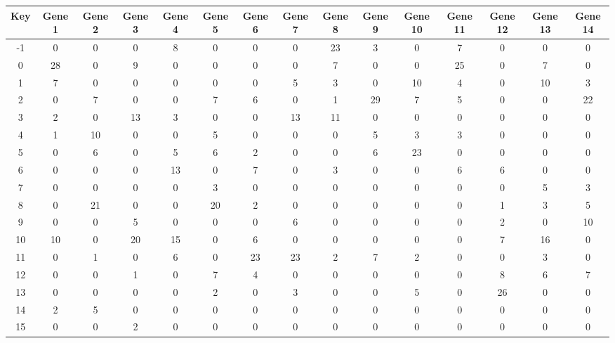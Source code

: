 \begin{tabular}{|c|c|c|c|c|c|c|c|c|c|c|c|c|c|c|}
\hline
Key & Gene 1 & Gene 2 & Gene 3 & Gene 4 & Gene 5 & Gene 6 & Gene 7 & Gene 8 & Gene 9 & Gene 10 & Gene 11 & Gene 12 & Gene 13 & Gene 14 \\
\hline
-1 & 0 & 0 & 0 & 8 & 0 & 0 & 0 & 23 & 3 & 0 & 7 & 0 & 0 & 0 \\
0 & 28 & 0 & 9 & 0 & 0 & 0 & 0 & 7 & 0 & 0 & 25 & 0 & 7 & 0 \\
1 & 7 & 0 & 0 & 0 & 0 & 0 & 5 & 3 & 0 & 10 & 4 & 0 & 10 & 3 \\
2 & 0 & 7 & 0 & 0 & 7 & 6 & 0 & 1 & 29 & 7 & 5 & 0 & 0 & 22 \\
3 & 2 & 0 & 13 & 3 & 0 & 0 & 13 & 11 & 0 & 0 & 0 & 0 & 0 & 0 \\
4 & 1 & 10 & 0 & 0 & 5 & 0 & 0 & 0 & 5 & 3 & 3 & 0 & 0 & 0 \\
5 & 0 & 6 & 0 & 5 & 6 & 2 & 0 & 0 & 6 & 23 & 0 & 0 & 0 & 0 \\
6 & 0 & 0 & 0 & 13 & 0 & 7 & 0 & 3 & 0 & 0 & 6 & 6 & 0 & 0 \\
7 & 0 & 0 & 0 & 0 & 3 & 0 & 0 & 0 & 0 & 0 & 0 & 0 & 5 & 3 \\
8 & 0 & 21 & 0 & 0 & 20 & 2 & 0 & 0 & 0 & 0 & 0 & 1 & 3 & 5 \\
9 & 0 & 0 & 5 & 0 & 0 & 0 & 6 & 0 & 0 & 0 & 0 & 2 & 0 & 10 \\
10 & 10 & 0 & 20 & 15 & 0 & 6 & 0 & 0 & 0 & 0 & 0 & 7 & 16 & 0 \\
11 & 0 & 1 & 0 & 6 & 0 & 23 & 23 & 2 & 7 & 2 & 0 & 0 & 3 & 0 \\
12 & 0 & 0 & 1 & 0 & 7 & 4 & 0 & 0 & 0 & 0 & 0 & 8 & 6 & 7 \\
13 & 0 & 0 & 0 & 0 & 2 & 0 & 3 & 0 & 0 & 5 & 0 & 26 & 0 & 0 \\
14 & 2 & 5 & 0 & 0 & 0 & 0 & 0 & 0 & 0 & 0 & 0 & 0 & 0 & 0 \\
15 & 0 & 0 & 2 & 0 & 0 & 0 & 0 & 0 & 0 & 0 & 0 & 0 & 0 & 0 \\
\hline
\end{tabular}